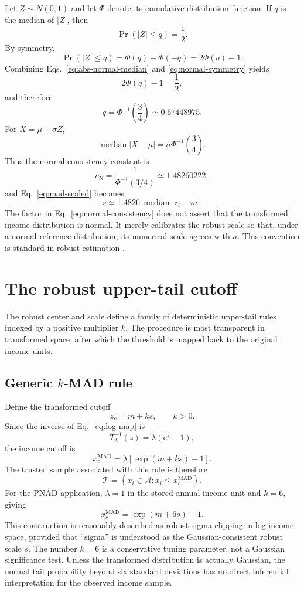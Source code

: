 \documentclass[12pt]{article}
\newcommand{\be}{\begin{equation}}
\newcommand{\ee}{\end{equation}}
\newcommand{\e}{{\mathrm{e}}}
\numberwithin{equation}{section}
\begin{document}
Let $Z\sim N(0,1)$ and let $\Phi$ denote its cumulative distribution function. If $q$ is the median of $|Z|$, then
\be
\Pr\left(|Z|\leq q\right)
=\frac{1}{2}.
\label{eq:abs-normal-median}
\ee
By symmetry,
\be
\Pr\left(|Z|\leq q\right)
=
\Phi(q)-\Phi(-q)
=
2\Phi(q)-1.
\label{eq:normal-symmetry}
\ee
Combining Eqs.~\eqref{eq:abs-normal-median} and \eqref{eq:normal-symmetry} yields
\be
2\Phi(q)-1
=
\frac{1}{2},
\ee
and therefore
\be
q
=
\Phi^{-1}\left(\frac{3}{4}\right)
\simeq
0.67448975.
\label{eq:qnormal}
\ee
For $X=\mu+\sigma Z$,
\be
\operatorname{median}|X-\mu|
=
\sigma\Phi^{-1}\left(\frac{3}{4}\right).
\label{eq:normal-mad}
\ee
Thus the normal-consistency constant is
\be
c_{\mathrm{N}}
=
\frac{1}{\Phi^{-1}(3/4)}
\simeq
1.48260222,
\label{eq:normal-consistency}
\ee
and Eq.~\eqref{eq:mad-scaled} becomes
\be
s
\simeq
1.4826\,
\operatorname{median}|z_i-m|.
\label{eq:scaled-mad-final}
\ee
The factor in Eq.~\eqref{eq:normal-consistency} does not assert that the transformed income distribution is normal. It merely calibrates the robust scale so that, under a normal reference distribution, its numerical scale agrees with $\sigma$. This convention is standard in robust estimation \cite{rousseeuw1993}.

\section{The robust upper-tail cutoff}

The robust center and scale define a family of deterministic upper-tail rules indexed by a positive multiplier $k$. The procedure is most transparent in transformed space, after which the threshold is mapped back to the original income units.

\subsection{Generic $k$-MAD rule}

Define the transformed cutoff
\be
z_c
=
m+ks,
\qquad k>0.
\label{eq:zc}
\ee
Since the inverse of Eq.~\eqref{eq:log-map} is
\be
T_{\lambda}^{-1}(z)
=
\lambda\left(\e^z-1\right),
\label{eq:inverse-log-map}
\ee
the income cutoff is
\be
x_c^{\mathrm{MAD}}
=
\lambda\left[\exp(m+ks)-1\right].
\label{eq:mad-cutoff-general}
\ee
The trusted sample associated with this rule is therefore
\be
\mathcal{T}
=
\left\{x_i\in\mathcal{A}:x_i\leq x_c^{\mathrm{MAD}}\right\}.
\label{eq:trusted-generic}
\ee
For the PNAD application, $\lambda=1$ in the stored annual income unit and $k=6$, giving
\be
x_c^{\mathrm{MAD}}
=
\exp(m+6s)-1.
\label{eq:pnad-cutoff}
\ee
This construction is reasonably described as robust sigma clipping in log-income space, provided that ``sigma'' is understood as the Gaussian-consistent robust scale $s$. The number $k=6$ is a conservative tuning parameter, not a Gaussian significance test. Unless the transformed distribution is actually Gaussian, the normal tail probability beyond six standard deviations has no direct inferential interpretation for the observed income sample.
\end{document}
